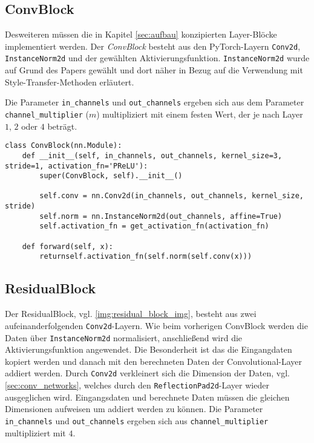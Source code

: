 \subsection{ConvBlock}

Desweiteren müssen die in Kapitel \ref{sec:aufbau} konzipierten Layer-Blöcke implementiert werden.
Der \textit{ConvBlock} besteht aus den PyTorch-Layern \texttt{Conv2d}, \texttt{InstanceNorm2d} und der gewählten Aktivierungsfunktion.
\texttt{InstanceNorm2d} wurde auf Grund des Papers \cite{DBLP:journals/corr/UlyanovVL16} gewählt und dort näher in Bezug auf die Verwendung mit Style-Transfer-Methoden erläutert.

Die Parameter \texttt{in_channels} und \texttt{out_channels} ergeben sich aus dem Parameter \texttt{channel_multiplier} ($ m $) multipliziert mit einem festen Wert, der je nach Layer $ 1 $, $ 2 $ oder $ 4 $ beträgt.

\begin{listing}[H]
\begin{verbatim}
class ConvBlock(nn.Module):
    def __init__(self, in_channels, out_channels, kernel_size=3, stride=1, activation_fn='PReLU'):
        super(ConvBlock, self).__init__()

        self.conv = nn.Conv2d(in_channels, out_channels, kernel_size, stride)
        self.norm = nn.InstanceNorm2d(out_channels, affine=True)
        self.activation_fn = get_activation_fn(activation_fn)

    def forward(self, x):
        returnself.activation_fn(self.norm(self.conv(x)))
\end{verbatim}
\end{listing}

\pagebreak

\subsection{ResidualBlock}

Der ResidualBlock, vgl. \ref{img:residual_block_img}, besteht aus zwei aufeinanderfolgenden \texttt{Conv2d}-Layern. Wie beim vorherigen ConvBlock werden die Daten über \texttt{InstanceNorm2d} normalisiert, anschließend wird die Aktivierungsfunktion angewendet. Die Besonderheit ist das die Eingangdaten kopiert werden und danach mit den berechneten Daten der Convolutional-Layer addiert werden. Durch \texttt{Conv2d} verkleinert sich die Dimension der Daten, vgl. \ref{sec:conv_networks}, welches durch den \texttt{ReflectionPad2d}-Layer wieder ausgeglichen wird. Eingangsdaten und berechnete Daten müssen die gleichen Dimensionen aufweisen um addiert werden zu können. Die Parameter \texttt{in_channels} und \texttt{out_channels} ergeben sich aus \texttt{channel_multiplier} multipliziert mit $ 4 $.


